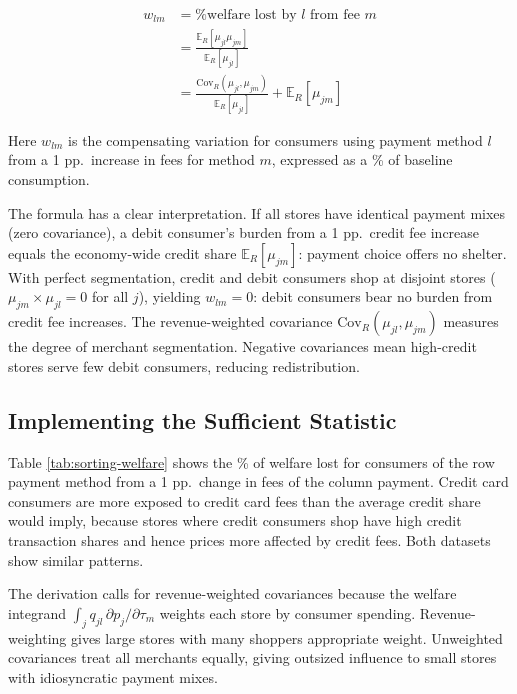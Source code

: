 \documentclass[main.tex]{subfiles}
\begin{document}
\begin{align*}
w_{lm} & =\text{\% welfare lost by }l\text{ from fee }m\\
 & =\frac{\mathbb{E}_{R}\left[\mu_{jl}\mu_{jm}\right]}{\mathbb{E}_{R}\left[\mu_{jl}\right]}\\
 & =\frac{\text{Cov}_{R}\left(\mu_{jl},\mu_{jm}\right)}{\mathbb{E}_{R}\left[\mu_{jl}\right]}+\mathbb{E}_{R}\left[\mu_{jm}\right]
\end{align*}

Here $w_{lm}$ is the compensating variation for consumers using payment method $l$ from a 1 pp.\ increase in fees for method $m$, expressed as a \% of baseline consumption.

The formula has a clear interpretation.
If all stores have identical payment mixes (zero covariance), a debit consumer's burden from a 1 pp.\ credit fee increase equals the economy-wide credit share $\mathbb{E}_R[\mu_{jm}]$: payment choice offers no shelter.
With perfect segmentation, credit and debit consumers shop at disjoint stores ($\mu_{jm} \times \mu_{jl} = 0$ for all $j$), yielding $w_{lm}=0$: debit consumers bear no burden from credit fee increases.
The revenue-weighted covariance $\text{Cov}_R(\mu_{jl},\mu_{jm})$ measures the degree of merchant segmentation. Negative covariances mean high-credit stores serve few debit consumers, reducing redistribution.

\subsection{Implementing the Sufficient Statistic}

Table \ref{tab:sorting-welfare} shows the \% of welfare lost for consumers of the row payment method from a 1 pp.\ change in fees of the column payment.
Credit card consumers are more exposed to credit card fees than the average credit share would imply, because stores where credit consumers shop have high credit transaction shares and hence prices more affected by credit fees.
Both datasets show similar patterns.

The derivation calls for revenue-weighted covariances because the welfare integrand $\int_j q_{jl}\, \partial p_j / \partial \tau_m$ weights each store by consumer spending.
Revenue-weighting gives large stores with many shoppers appropriate weight.
Unweighted covariances treat all merchants equally, giving outsized influence to small stores with idiosyncratic payment mixes.
\end{document}

